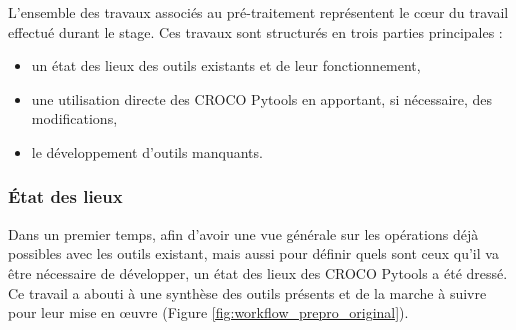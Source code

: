 \documentclass[10pt,a4paper,titlepage]{article}
\begin{document}
L'ensemble des travaux associés au pré-traitement représentent le c\oe{}ur du travail effectué durant le stage.
Ces travaux sont structurés en trois parties principales :
\begin{itemize}
    \item un état des lieux des outils existants et de leur fonctionnement,
    \item une utilisation directe des CROCO Pytools en apportant, si nécessaire, des modifications,
    \item le développement d'outils manquants.
\end{itemize}

\subsubsection{État des lieux}
\label{subsub:etat_des_lieux}

Dans un premier temps, afin d'avoir une vue générale sur les opérations déjà possibles avec les outils existant, mais aussi pour définir quels sont ceux qu'il va être nécessaire de développer, un état des lieux des CROCO Pytools a été dressé.
Ce travail a abouti à une synthèse des outils présents et de la marche à suivre pour leur mise en \oe{}uvre (Figure \ref{fig:workflow_prepro_original}).
\end{document}
